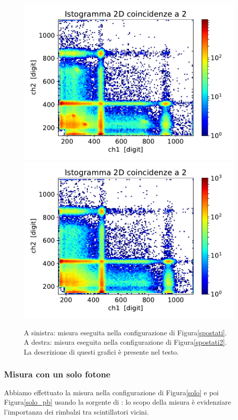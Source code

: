 \begin{figure}[h]
\centering
\hspace{-2.5 cm}
\subfloat
{
\includegraphics[width=21 em]{immagini/0518_rimbalzi}
\label{spostato}
}
\subfloat
{
\includegraphics[width=21 em]{immagini/0518_piombo}
\label{piombo}
}
\caption{A sinistra: misura eseguita nella configurazione di Figura\autoref{spostati}. \\
A destra: misura eseguita nella configurazione di Figura\autoref{spostati2}.  \\
La descrizione di questi grafici è presente nel testo.}

\end{figure}

\subsubsection{Misura con un solo fotone}

Abbiamo effettuato la misura nella configurazione di Figura\autoref{solo} e poi Figura\autoref{solo_pb} usando la sorgente di \cs{}: lo scopo della misura è evidenziare l'importanza dei rimbalzi tra scintillatori vicini.

